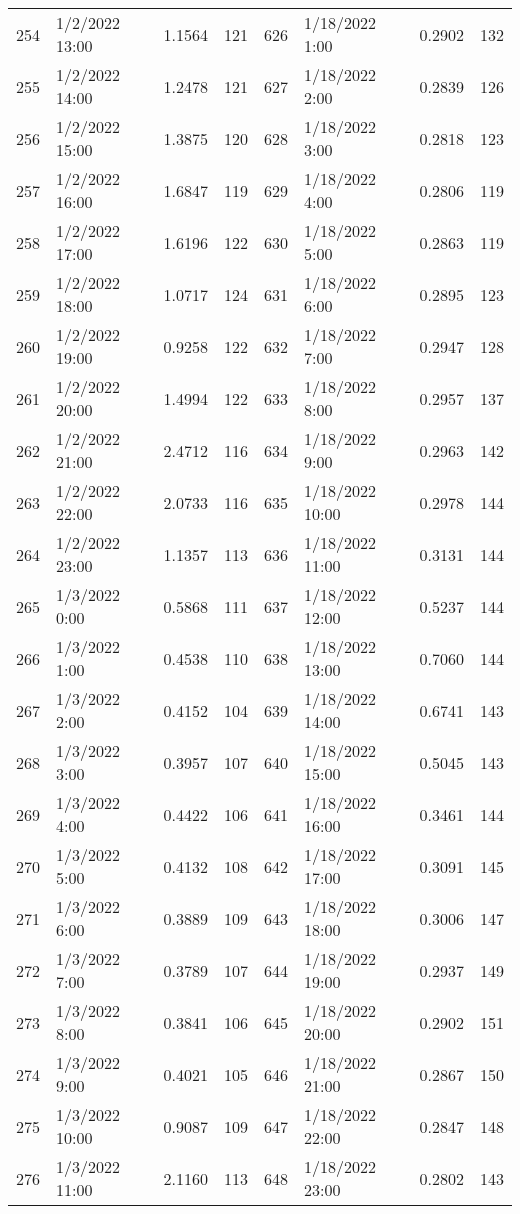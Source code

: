 \begin{center}
\begin{longtable}{llccllcc}
    254&1/2/2022 13:00	   &1.1564&121&626&1/18/2022 1:00	    &0.2902&132 \\
    255&1/2/2022 14:00	   &1.2478&121&627&1/18/2022 2:00	    &0.2839&126 \\
    256&1/2/2022 15:00	   &1.3875&120&628&1/18/2022 3:00	    &0.2818&123 \\
    257&1/2/2022 16:00	   &1.6847&119&629&1/18/2022 4:00	    &0.2806&119 \\
    258&1/2/2022 17:00	   &1.6196&122&630&1/18/2022 5:00	    &0.2863&119 \\
    259&1/2/2022 18:00	   &1.0717&124&631&1/18/2022 6:00	    &0.2895&123 \\
    260&1/2/2022 19:00	   &0.9258&122&632&1/18/2022 7:00	    &0.2947&128 \\
    261&1/2/2022 20:00	   &1.4994&122&633&1/18/2022 8:00	    &0.2957&137 \\
    262&1/2/2022 21:00	   &2.4712&116&634&1/18/2022 9:00	    &0.2963&142 \\
    263&1/2/2022 22:00	   &2.0733&116&635&1/18/2022 10:00	    &0.2978&144 \\
    264&1/2/2022 23:00	   &1.1357&113&636&1/18/2022 11:00	    &0.3131&144 \\
    265&1/3/2022 0:00	   &0.5868&111&637&1/18/2022 12:00	    &0.5237&144 \\
    266&1/3/2022 1:00	   &0.4538&110&638&1/18/2022 13:00	    &0.7060&144 \\
    267&1/3/2022 2:00	   &0.4152&104&639&1/18/2022 14:00	    &0.6741&143 \\
    268&1/3/2022 3:00	   &0.3957&107&640&1/18/2022 15:00	    &0.5045&143 \\
    269&1/3/2022 4:00	   &0.4422&106&641&1/18/2022 16:00	    &0.3461&144 \\
    270&1/3/2022 5:00	   &0.4132&108&642&1/18/2022 17:00	    &0.3091&145 \\
    271&1/3/2022 6:00	   &0.3889&109&643&1/18/2022 18:00	    &0.3006&147 \\
    272&1/3/2022 7:00	   &0.3789&107&644&1/18/2022 19:00	    &0.2937&149 \\
    273&1/3/2022 8:00	   &0.3841&106&645&1/18/2022 20:00	    &0.2902&151 \\
    274&1/3/2022 9:00	   &0.4021&105&646&1/18/2022 21:00	    &0.2867&150 \\
    275&1/3/2022 10:00	   &0.9087&109&647&1/18/2022 22:00	    &0.2847&148 \\
    276&1/3/2022 11:00	   &2.1160&113&648&1/18/2022 23:00	    &0.2802&143 \\

\end{longtable}
\end{center}
